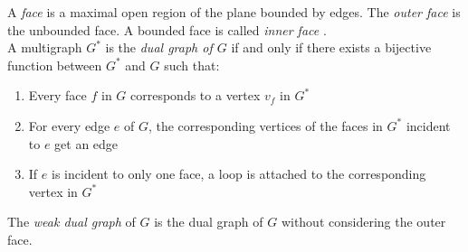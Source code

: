 A \emph{face} is a maximal open region of the plane bounded by edges. The \emph{outer face} is the unbounded face. A bounded face is called \emph{inner face} \cite[S. 86]{Diestel_GraphTheory}.\\
A multigraph $G^*$ is the \emph{dual graph of $G$} if and only if there exists a bijective function between $G^*$ and $G$ such that:
\begin{enumerate}
	\item Every face $f$ in $G$ corresponds to a vertex $v_f$ in $G^*$
	\item For every edge $e$ of $G$, the corresponding vertices of the faces in $G^*$ incident to $e$ get an edge 
	\item If $e$ is incident to only one face, a loop is attached to the corresponding vertex in $G^*$
\end{enumerate}\cite[P. 103]{Diestel_GraphTheory}
The \emph{weak dual graph} of $G$ is the dual graph of $G$ without considering the outer face.



